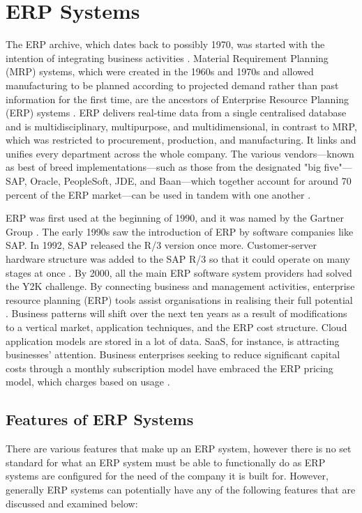 \section{ERP Systems}
\par{The ERP archive, which dates back to possibly 1970, was started with the intention of integrating business activities \citep{shields2004business}. Material Requirement Planning (MRP) systems, which were created in the 1960s and 1970s and allowed manufacturing to be planned according to projected demand rather than past information for the first time, are the ancestors of Enterprise Resource Planning (ERP) systems \citep{ahlawat2017role}. ERP delivers real-time data from a single centralised database and is multidisciplinary, multipurpose, and multidimensional, in contrast to MRP, which was restricted to procurement, production, and manufacturing. It links and unifies every department across the whole company. The various vendors—known as best of breed implementations—such as those from the designated "big five"—SAP, Oracle, PeopleSoft, JDE, and Baan—which together account for around 70 percent of the ERP market—can be used in tandem with one another \citep{light2001erp}. 

ERP was first used at the beginning of 1990, and it was named by the Gartner Group \citep{chang2000delphi}. The early 1990s saw the introduction of ERP by software companies like SAP. In 1992, SAP released the R/3 version once more. Customer-server hardware structure was added to the SAP R/3 so that it could operate on many stages at once \citep{jacobs2007enterprise}. By 2000, all the main ERP software system providers had solved the Y2K challenge. By connecting business and management activities, enterprise resource planning (ERP) tools assist organisations in realising their full potential \citep{uccakturk2013effects}. Business patterns will shift over the next ten years as a result of modifications to a vertical market, application techniques, and the ERP cost structure. Cloud application models are stored in a lot of data. SaaS, for instance, is attracting businesses' attention. Business enterprises seeking to reduce significant capital costs through a monthly subscription model have embraced the ERP pricing model, which charges based on usage \citep{kenge2020research}.}
\subsection{Features of ERP Systems}
\par{There are various features that make up an ERP system, however there is no set standard for what an ERP system must be able to functionally do as ERP systems are configured for the need of the company it is built for. However, generally ERP systems can potentially have any of the following features that are discussed and examined below:}
